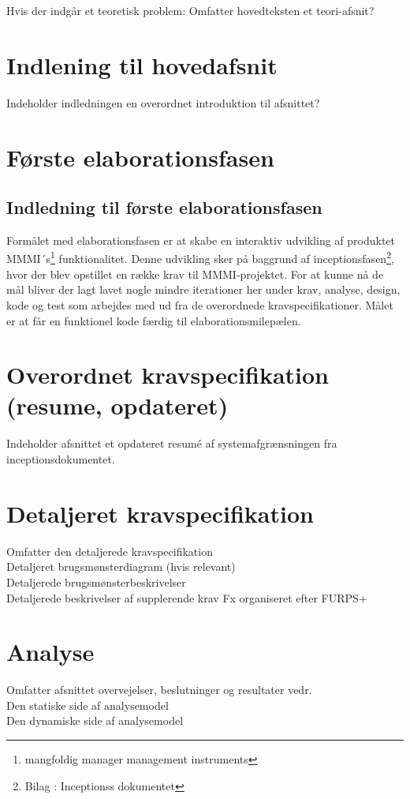 Hvis der indgår et teoretisk problem: Omfatter hovedteksten et teori-afsnit?\\
\section{Indlening til hovedafsnit}
Indeholder indledningen en overordnet introduktion til afsnittet?\\
\section{Første elaborationsfasen}
\subsection{Indledning til første elaborationsfasen}
Formålet med elaborationsfasen er at skabe en interaktiv udvikling af produktet MMMI´s\footnote{{mangfoldig manager management instruments}} funktionalitet. Denne udvikling sker på baggrund af inceptionsfasen\footnote{{Bilag : Inceptionss dokumentet}}, hvor der blev opstillet en række krav til MMMI-projektet.  For at kunne nå de mål bliver der lagt lavet nogle mindre iterationer her under krav, analyse, design, kode og test som arbejdes med ud fra de overordnede kravspecifikationer. Målet er at får en funktionel kode færdig til elaborationsmilepælen. 



\section{Overordnet kravspecifikation (resume, opdateret)}
Indeholder afsnittet et opdateret resumé  af systemafgrænsningen fra inceptionsdokumentet.
\section{Detaljeret kravspecifikation}
Omfatter den detaljerede kravspecifikation\\
Detaljeret brugsmønsterdiagram (hvis relevant)\\
Detaljerede brugsmønsterbeskrivelser\\
Detaljerede beskrivelser af supplerende krav Fx organiseret efter FURPS+\\
\section{Analyse}
Omfatter afsnittet overvejelser, beslutninger og resultater vedr.\\
Den statiske side af analysemodel\\
Den dynamiske side af analysemodel\\
